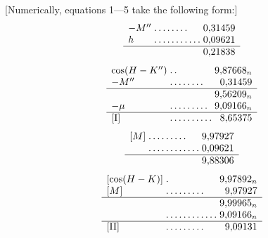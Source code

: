 [Numerically, equations 1—5 take the following form:]
\[
\begin{array}{l@{\;}l@{\;}r}
-M''&\mathord{.}\,\mathord{.}\,\mathord{.}\,\mathord{.}\,\mathord{.}\,\mathord{.}\,\mathord{.}\,\mathord{.}&0{,}31459\\
h&\mathord{.}\,\mathord{.}\,\mathord{.}\,\mathord{.}\,\mathord{.}\,\mathord{.}\,\mathord{.}\,\mathord{.}\,\mathord{.}\,\mathord{.}\,\mathord{.}&0{,}09621\\\hline
&&0{,}21838
\end{array}
\]
\[
\begin{array}{l@{\;}l@{\;}r}
\cos(H-K'')&\mathord{.}\,\mathord{.}&9{,}87668_n\\
-M''&\mathord{.}\,\mathord{.}\,\mathord{.}\,\mathord{.}\,\mathord{.}\,\mathord{.}\,\mathord{.}\,\mathord{.}&0{,}31459\\\hline
&&9{,}56209_n\\
-\mu&\mathord{.}\,\mathord{.}\,\mathord{.}\,\mathord{.}\,\mathord{.}\,\mathord{.}\,\mathord{.}\,\mathord{.}\,\mathord{.}&9{,}09166_n\\\hline
[\mathrm{I}]&\mathord{.}\,\mathord{.}\,\mathord{.}\,\mathord{.}\,\mathord{.}\,\mathord{.}\,\mathord{.}\,\mathord{.}\,\mathord{.}\,\mathord{.}&8{,}65375
\end{array}
\]
\[
\begin{array}{l@{\;}l@{\;}r}
[M]&\mathord{.}\,\mathord{.}\,\mathord{.}\,\mathord{.}\,\mathord{.}\,\mathord{.}\,\mathord{.}\,\mathord{.}\,\mathord{.}&9{,}97927\\
&\mathord{.}\,\mathord{.}\,\mathord{.}\,\mathord{.}\,\mathord{.}\,\mathord{.}\,\mathord{.}\,\mathord{.}\,\mathord{.}\,\mathord{.}\,\mathord{.}\,\mathord{.}&0{,}09621\\\hline
&&9{,}88306
\end{array}
\]
\[
\begin{array}{l@{\;}l@{\;}r}
[\cos(H-K)]&\mathord{.}&9{,}97892_n\\
{}[M]&\mathord{.}\,\mathord{.}\,\mathord{.}\,\mathord{.}\,\mathord{.}\,\mathord{.}\,\mathord{.}\,\mathord{.}\,\mathord{.}&9{,}97927\\\hline
&&9{,}99965_n\\
&\mathord{.}\,\mathord{.}\,\mathord{.}\,\mathord{.}\,\mathord{.}\,\mathord{.}\,\mathord{.}\,\mathord{.}\,\mathord{.}\,\mathord{.}\,\mathord{.}\,\mathord{.}&9{,}09166_n\\\hline
[\mathrm{II}]&\mathord{.}\,\mathord{.}\,\mathord{.}\,\mathord{.}\,\mathord{.}\,\mathord{.}\,\mathord{.}\,\mathord{.}\,\mathord{.}&9{,}09131
\end{array}
\]
